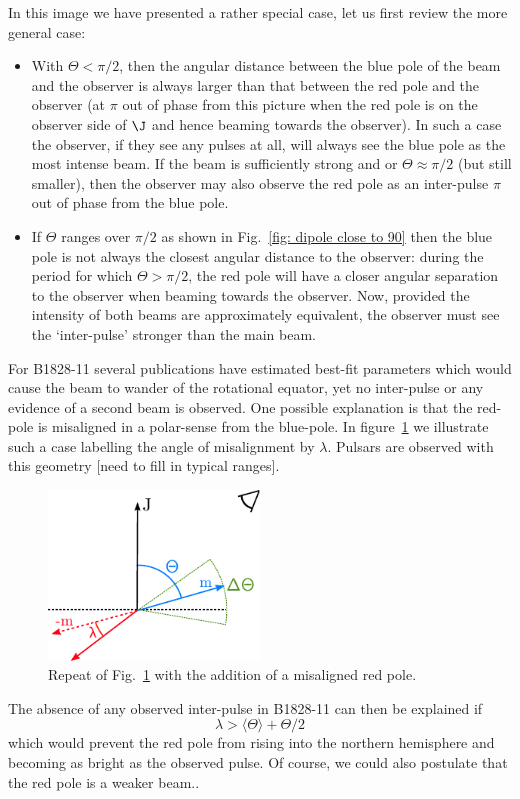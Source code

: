 \documentclass[/home/greg/Thesis/main/main.tex]{subfiles}
\begin{document}
In this image we have presented a rather special case, let us first review the
more general case:
\begin{itemize}

\item With $\Theta < \pi/2$, then the angular distance between the blue pole of
the beam and the observer is always larger than that between the red pole and
the observer (at $\pi$ out of phase from this picture when the red pole is on
the observer side of $\J$ and hence beaming towards the observer). In such a
case the observer, if they see any pulses at all, will always see the blue pole
as the most intense beam. If the beam is sufficiently strong and or $\Theta
\approx \pi/2$ (but still smaller), then the observer may also observe the red
pole as an inter-pulse $\pi$ out of phase from the blue pole.

\item If $\Theta$ ranges over $\pi/2$ as shown in Fig.~\ref{fig: dipole close
to 90} then the blue pole is not always the closest angular distance to the
observer: during the period for which $\Theta>\pi/2$, the red pole will have a
closer angular separation to the observer when beaming towards the observer. Now,
provided the intensity of both beams are approximately equivalent, the observer
must see the `inter-pulse' stronger than the main beam.
\end{itemize}

For B1828-11 several publications have estimated best-fit parameters which would
cause the beam to wander of the rotational equator, yet no inter-pulse or any
evidence of a second beam is observed. One possible explanation is that the
red-pole is misaligned in a polar-sense from the blue-pole. In
figure~\ref{fig: dipole close to 90 missaligned} we illustrate such a case labelling
the angle of misalignment by $\lambda$. Pulsars are observed with this geometry
[need to fill in typical ranges]. 


\begin{figure}[htb]
\centering
\includegraphics[width=0.5\textwidth]{img/MissingTheOtherPoleMissaligned}
\caption{Repeat of Fig.~\ref{fig: dipole close to 90 missaligned} with the addition
of a misaligned red pole.}
\label{fig: dipole close to 90 missaligned}
\end{figure}

The absence of any observed inter-pulse in B1828-11 can then be explained if
\begin{equation}
\lambda > \langle\Theta\rangle + \Theta/2
\end{equation}
which would prevent the red pole from rising into the northern hemisphere and
becoming as bright as the observed pulse. Of course, we could also postulate that
the red pole is a weaker beam..
\biblio
\end{document}
